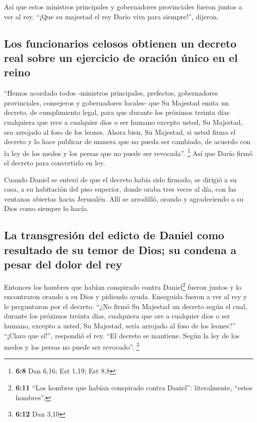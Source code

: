  Así que estos ministros principales y gobernadores
provinciales fueron juntos a ver al rey. ``¡Que su majestad el rey Darío
viva para siempre!'', dijeron.

\hypertarget{los-funcionarios-celosos-obtienen-un-decreto-real-sobre-un-ejercicio-de-oraciuxf3n-uxfanico-en-el-reino}{%
\subsection{Los funcionarios celosos obtienen un decreto real sobre un
ejercicio de oración único en el
reino}\label{los-funcionarios-celosos-obtienen-un-decreto-real-sobre-un-ejercicio-de-oraciuxf3n-uxfanico-en-el-reino}}

 ``Hemos acordado todos -ministros principales, prefectos,
gobernadores provinciales, consejeros y gobernadores locales- que Su
Majestad emita un decreto, de cumplimiento legal, para que durante los
próximos treinta días cualquiera que rece a cualquier dios o ser humano
excepto usted, Su Majestad, sea arrojado al foso de los leones.
 Ahora bien, Su Majestad, si usted firma el decreto y lo
hace publicar de manera que no pueda ser cambiado, de acuerdo con la ley
de los medos y los persas que no puede ser revocada''. \footnote{\textbf{6:8}
  Dan 6,16; Est 1,19; Est 8,8}  Así que Darío firmó el
decreto para convertirlo en ley.

 Cuando Daniel se enteró de que el decreto había sido
firmado, se dirigió a su casa, a su habitación del piso superior, donde
oraba tres veces al día, con las ventanas abiertas hacia Jerusalén. Allí
se arrodilló, orando y agradeciendo a su Dios como siempre lo hacía.

\hypertarget{la-transgresiuxf3n-del-edicto-de-daniel-como-resultado-de-su-temor-de-dios-su-condena-a-pesar-del-dolor-del-rey}{%
\subsection{La transgresión del edicto de Daniel como resultado de su
temor de Dios; su condena a pesar del dolor del
rey}\label{la-transgresiuxf3n-del-edicto-de-daniel-como-resultado-de-su-temor-de-dios-su-condena-a-pesar-del-dolor-del-rey}}

 Entonces los hombres que habían conspirado contra
Daniel\footnote{\textbf{6:11} ``Los hombres que habían conspirado contra
  Daniel'': literalmente, ``estos hombres''.} fueron juntos y lo
encontraron orando a su Dios y pidiendo ayuda.  Enseguida
fueron a ver al rey y le preguntaron por el decreto. ``¿No firmó Su
Majestad un decreto según el cual, durante los próximos treinta días,
cualquiera que ore a cualquier dios o ser humano, excepto a usted, Su
Majestad, sería arrojado al foso de los leones?'' ``¡Claro que sí!'',
respondió el rey. ``El decreto se mantiene. Según la ley de los medos y
los persas no puede ser revocado''. \footnote{\textbf{6:12} Dan 3,10}

